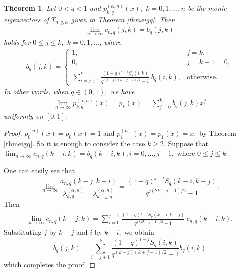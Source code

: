 \documentclass[12pt]{article}
\numberwithin{equation}{section} \theoremstyle{plain}
\newtheorem{theorem}{Theorem}[section]
\theoremstyle{definition}
\theoremstyle{remark}
\begin{document}
\begin{theorem}
Let $0 < q < 1$ and $p_{k,q}^{(\alpha,n)}(x),$ $k=0,1,\ldots, n$ be the monic eigenvectors of $T_{n,q,\alpha}$ given in Theorem \ref{thmeigq}. Then 
\begin{eqnarray*}
\lim_{n\to\infty} c_{n,q}(j,k)=b_q(j,k)
\end{eqnarray*}
holds for $0\leq j \leq k,$ $k=0,1,\dots$, where
\begin{eqnarray*}
b_q(j,k)=\left\{\begin{array}{cl}
1, & j=k, \\
0, & j=k-1=0,\\
\displaystyle \sum_{i=j+1}^k \frac{(1-q)^{i-j}S_q(i,k)}{q^{(k-j)(k+j-1)/2}-1} \ b_q(i, k), & \textrm{otherwise}.
\end{array}
\right.
\end{eqnarray*}
In other words, when $q\in (0, 1),$ we have
\begin{align*}
\lim_{n\to\infty} p_{k,q}^{(\alpha,n)}(x)=p_k(x)=\sum_{j=0}^k b_q(j,k)x^j
\end{align*}
 uniformly on $[0,1].$
\end{theorem}
\begin{proof}
$p_0^{(n)}(x)=p_0(x)=1$ and $p_1^{(n)}(x)=p_1(x)=x,$ by Theorem \ref{thmeigq}. So it is enough to consider the case $k\geq2.$
Suppose that
$\lim_{n\to\infty} c_{n, q}(k-i, k)=b_q(k-i, k),
i=0,\ldots,j-1,$ where $0\leq j \leq k.$ 

One can easily see that 
\begin{equation*}
\lim_{n\to\infty}\frac{a_{n,q}(k-j,k-i)}{\lambda_{k,q}^{(\alpha,n)}-\lambda_{k-j,q}^{(\alpha,n)}}=\frac{(1-q)^{j-i}S_q(k-i,k-j)}{q^{j(2k-j-1)/2}-1}.
\end{equation*}
Then 
\begin{align*}
\lim_{n\to\infty} c_{n,q}(k-j, k)=\sum_{i=0}^{j-1}\frac{(1-q)^{j-i}S_q(k-i, k-j)}{q^{j(2k-j-1)/2}-1}\ c_{n,q}(k-i, k).
\end{align*}
Substituting  $j$ by $k-j$ and $i$ by $k-i,$ we obtain
\begin{equation*}
b_q(j,k)=\sum_{i=j+1}^{k}\frac{(1-q)^{i-j}S_q(i, k)}{q^{(k-j)(k+j-1)/2}-1}b_q(i, k)
\end{equation*}
which completes the proof.
\end{proof}
\end{document}
